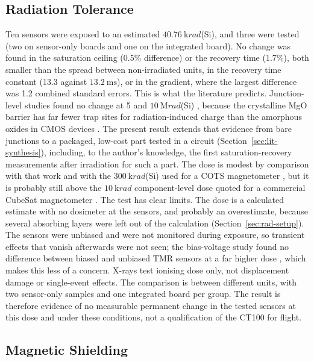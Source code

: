 \documentclass[12pt,a4paper]{article}
\begin{document}
\subsection{Radiation Tolerance}
\label{sec:disc-radiation}

Ten sensors were exposed to an estimated $\SI{40.76}{\kilo rad}$(Si), and three were tested (two on sensor-only boards and one on the integrated board). No change was found in the saturation ceiling (0.5\% difference) or the recovery time (1.7\%), both smaller than the spread between non-irradiated units, in the recovery time constant (13.3 against $\SI{13.2}{\milli\second}$), or in the gradient, where the largest difference was 1.2 combined standard errors. This is what the literature predicts. Junction-level studies found no change at 5 and $\SI{10}{\mega rad}$(Si) \cite{tmr-bias-radiation,ren2012}, because the crystalline MgO barrier has far fewer trap sites for radiation-induced charge than the amorphous oxides in CMOS devices \cite{tid-basics-lanl}. The present result extends that evidence from bare junctions to a packaged, low-cost part tested in a circuit (Section~\ref{sec:lit-synthesis}), including, to the author's knowledge, the first saturation-recovery measurements after irradiation for such a part. The dose is modest by comparison with that work and with the $\SI{300}{\kilo rad}$(Si) used for a COTS magnetometer \cite{regoli2020}, but it is probably still above the $\SI{10}{\kilo rad}$ component-level dose quoted for a commercial CubeSat magnetometer \cite{nss_magnetometer}. The test has clear limits. The dose is a calculated estimate with no dosimeter at the sensors, and probably an overestimate, because several absorbing layers were left out of the calculation (Section~\ref{sec:rad-setup}). The sensors were unbiased and were not monitored during exposure, so transient effects that vanish afterwards were not seen; the bias-voltage study found no difference between biased and unbiased TMR sensors at a far higher dose \cite{tmr-bias-radiation}, which makes this less of a concern. X-rays test ionising dose only, not displacement damage or single-event effects. The comparison is between different units, with two sensor-only samples and one integrated board per group. The result is therefore evidence of no measurable permanent change in the tested sensors at this dose and under these conditions, not a qualification of the CT100 for flight.

\subsection{Magnetic Shielding}
\label{sec:disc-shielding}
\end{document}
